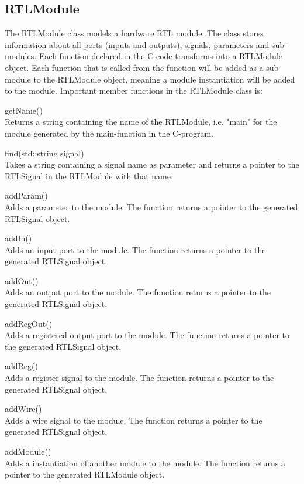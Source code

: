 \subsection{RTLModule}
The RTLModule class models a hardware RTL module. The class stores information about all ports (inputs and outputs), signals, parameters and sub-modules. Each function declared in the C-code transforms into a RTLModule object. Each function that is called from the function will be added as a sub-module to the RTLModule object, meaning a module instantiation will be added to the module. Important member functions in the RTLModule class is:
\begin{compactdesc}
    \item[getName()] \hfill \\
    Returns a string containing the name of the RTLModule, i.e. "main" for the module generated by the main-function in the C-program.
    \item[find(std::string signal)] \hfill \\
    Takes a string containing a signal name as parameter and returns a pointer to the RTLSignal in the RTLModule with that name.
    \item[addParam()] \hfill \\
    Adds a parameter to the module. The function returns a pointer to the generated RTLSignal object.
    \item[addIn()] \hfill \\
    Adds an input port to the module. The function returns a pointer to the generated RTLSignal object.
    \item[addOut()] \hfill \\
    Adds an output port to the module. The function returns a pointer to the generated RTLSignal object.
    \item[addRegOut()] \hfill \\
    Adds a registered output port to the module. The function returns a pointer to the generated RTLSignal object.
    \item[addReg()] \hfill \\
    Adds a register signal to the module. The function returns a pointer to the generated RTLSignal object.
    \item[addWire()] \hfill \\
    Adds a wire signal to the module. The function returns a pointer to the generated RTLSignal object.
    \item[addModule()] \hfill \\
    Adds a instantiation of another module to the module. The function returns a pointer to the generated RTLModule
    object.
\end{compactdesc}
